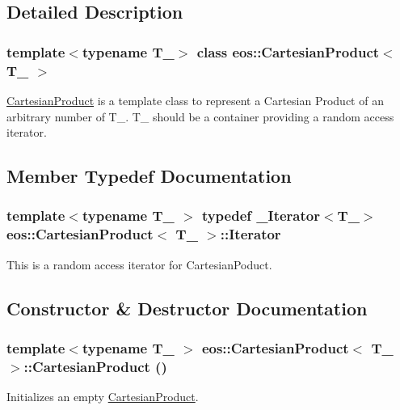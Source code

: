 \subsection{Detailed Description}
\subsubsection*{template$<$typename T\_\-$>$ class eos::CartesianProduct$<$ T\_\- $>$}

\hyperlink{classeos_1_1CartesianProduct}{CartesianProduct} is a template class to represent a Cartesian Product of an arbitrary number of T\_\-. T\_\- should be a container providing a random access iterator. 

\subsection{Member Typedef Documentation}
\hypertarget{classeos_1_1CartesianProduct_aa2ff28e4a1845a8ee763a877a8cd4346}{
\subsubsection[{Iterator}]{\setlength{\rightskip}{0pt plus 5cm}template$<$typename T\_\- $>$ typedef \_\-Iterator$<$T\_\-$>$ {\bf eos::CartesianProduct}$<$ T\_\- $>$::{\bf Iterator}}}
\label{classeos_1_1CartesianProduct_aa2ff28e4a1845a8ee763a877a8cd4346}


This is a random access iterator for CartesianPoduct. 

\subsection{Constructor \& Destructor Documentation}
\hypertarget{classeos_1_1CartesianProduct_ab31950cf7edf8589a6e86a81b36d9b4d}{
\subsubsection[{CartesianProduct}]{\setlength{\rightskip}{0pt plus 5cm}template$<$typename T\_\- $>$ {\bf eos::CartesianProduct}$<$ T\_\- $>$::{\bf CartesianProduct} ()}}
\label{classeos_1_1CartesianProduct_ab31950cf7edf8589a6e86a81b36d9b4d}
Initializes an empty \hyperlink{classeos_1_1CartesianProduct}{CartesianProduct}. 

